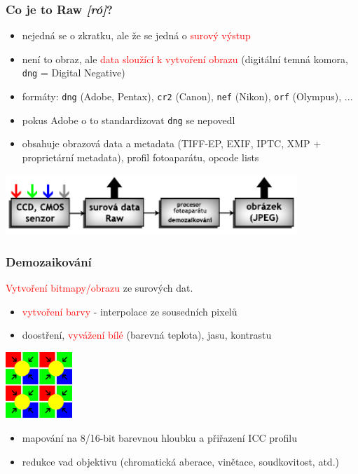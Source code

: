 \documentclass{beamer}
\begin{document}
		\begin{frame}[t,fragile]
		\frametitle{Co je to Raw \textit{[ró]}?}
		
		\begin{itemize}
			\item nejedná se o zkratku, ale že se jedná o \textcolor{red}{surový výstup}
			\item není to obraz, ale \textcolor{red}{data sloužící k vytvoření obrazu} (digitální temná komora, \verb!dng! = Digital Negative)
		
			\item formáty: \verb!dng! (Adobe, Pentax), \verb!cr2! (Canon), \verb!nef! (Nikon), \verb!orf! (Olympus), ...
			\item pokus Adobe o to standardizovat \verb!dng! se nepovedl
			\item obsahuje obrazová data a metadata (TIFF-EP, EXIF, IPTC, XMP + proprietární metadata), profil fotoaparátu, opcode lists

		\end{itemize}	
			
		\vspace{-6mm}\center\includegraphics[width=110mm]{chain.pdf}
		\vspace{3mm}
				
	\end{frame}		
	
	
	\begin{frame}[t,fragile]
		\frametitle{Demozaikování}		
		\textcolor{red}{Vytvoření bitmapy/obrazu} ze surových dat.

			\begin{itemize}
				\item \textcolor{red}{vytvoření barvy} - interpolace ze sousedních pixelů
				\item doostření, \textcolor{red}{vyvážení bílé} (barevná teplota), jasu, kontrastu

			\end{itemize}

		
		\center\includegraphics[height=25mm]{bayer-interpolation.pdf}		
		\begin{itemize}	
			\item mapování na 8/16-bit barevnou hloubku a přiřazení ICC profilu
			\item redukce vad objektivu (chromatická aberace, vinětace, soudkovitost, atd.)
		\end{itemize}
		
	\end{frame}	
	
\end{document}
